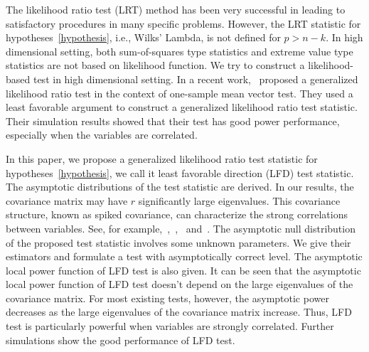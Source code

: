 \documentclass[12pt]{article} %
\newcommand{\bfsym}[1]{\ensuremath{\boldsymbol{#1}}}
\def\bSigma {\bfsym {\Sigma}}
\theoremstyle{definition}
\begin{document}
   The likelihood ratio test (LRT) method has been very successful in leading to satisfactory procedures in many specific problems.
    However, the LRT statistic for hypotheses~\eqref{hypothesis}, i.e., Wilks' Lambda, is not defined for $p>n-k$.
   In high dimensional setting, both sum-of-squares type statistics and extreme value type statistics are not based on likelihood function.
    We try to construct a likelihood-based test in high dimensional setting.
    In a recent work,~\cite{Zhao2016A} proposed a generalized likelihood ratio test in the context of one-sample mean vector test.
    They used a least favorable argument to construct a generalized likelihood ratio test statistic.
    Their simulation results showed that their test has good power performance, especially when the variables are correlated.


    In this paper, we propose a generalized likelihood ratio test statistic for hypotheses~\eqref{hypothesis}, we call it least favorable direction (LFD) test statistic.
    The asymptotic distributions of the test statistic are derived.
    In our results, the covariance matrix may have $r$ significantly large eigenvalues.
    This covariance structure, known as spiked covariance, can characterize the strong correlations between variables. See, for example,~\citet{Fan2008High},~\citet{Cai2012Sparse},~\citet{Shen2013Consistency} and~\citet{Ma2015A}.
    The asymptotic null distribution of the proposed test statistic involves some unknown parameters.
    We give their estimators and formulate a test with asymptotically correct level.
    The asymptotic local power function of LFD test is also given.
 It can be seen that the asymptotic local power function of LFD test doesn't depend on the large eigenvalues of the covariance matrix.
For most existing tests, however, the asymptotic power decreases as the large eigenvalues of the covariance matrix increase.
    Thus, LFD test is particularly powerful when variables are strongly correlated.
    Further simulations show the good performance of LFD test.
\end{document}
